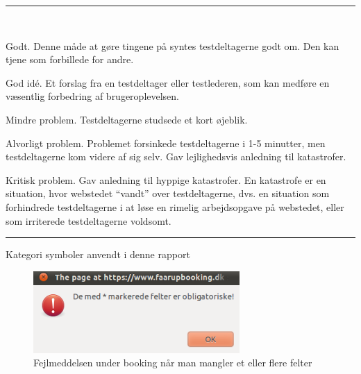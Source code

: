 \documentclass[10pt,a4paper]{article}      %
\newcommand\pic[1]{\texttt{[image: Pics/\#1]}}
\renewcommand\good{\pic{good}}
\renewcommand\goodidea{\pic{goodidea}}
\renewcommand\smallproblem{\pic{smallproblem}}
\renewcommand\seriousproblem{\pic{seriousproblem}}
\renewcommand\criticalproblem{\pic{criticalproblem}}
\begin{document}
\begin{table}[!ht]
\centering
\rule{\linewidth}{\heavyrulewidth}\\[6mm]
\begin{kommentarer}

\item[\good] Godt. Denne måde at gøre tingene på syntes testdeltagerne godt om.
Den kan tjene som forbillede for andre.

\item[\goodidea] God idé. Et forslag fra en testdeltager eller testlederen, som
kan medføre en væsentlig forbedring af brugeroplevelsen.

\item[\smallproblem] Mindre problem. Testdeltagerne studsede et kort øjeblik.

\item[\seriousproblem] Alvorligt problem. Problemet forsinkede testdeltagerne i 1-5
minutter, men testdeltagerne kom videre af sig selv. Gav lejlighedsvis
anledning til katastrofer.

\item[\criticalproblem] Kritisk problem. Gav anledning til hyppige katastrofer. En
katastrofe er en situation, hvor webstedet ``vandt'' over testdeltagerne, dvs.
en situation som forhindrede testdeltagerne i at løse en rimelig arbejdsopgave
på webstedet, eller som irriterede testdeltagerne voldsomt.

\end{kommentarer}
\rule{\linewidth}{\heavyrulewidth}
\caption{Kategori symboler anvendt i denne rapport}
\label{tab:gt}
\end{table}%
\clearpage


\begin{figure}[htbp]
    \centering
    \includegraphics[width=0.7\textwidth]{Pics/faarupfejlbooking}
    \caption{Fejlmeddelsen under booking når man mangler et eller flere felter }
    \label{fig:fejlmeddelelsebooking}
\end{figure}
\end{document}
